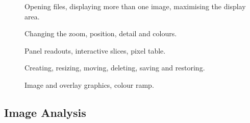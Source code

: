 \documentclass[twoside,11pt]{starlink}
\begin{document}
\begin{description}

  \item[]
   Opening files, displaying more than one image, maximising the
   display area.

  \item[]
   Changing the zoom, position, detail and colours.

  \item[]
   Panel readouts, interactive slices, pixel table.

  \item[]
   Creating, resizing, moving, deleting, saving and restoring.

  \item[]
   Image and overlay graphics, colour ramp.

\end{description}

\subsection{Image Analysis}
\end{document}
